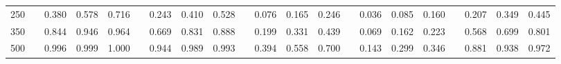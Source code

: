 % 
\begin{tabular}{ccccccccccccccccccccc}
  \hline
  \hline
250 &  & 0.380 & 0.578 & 0.716 &  & 0.243 & 0.410 & 0.528 &  & 0.076 & 0.165 & 0.246 &  & 0.036 & 0.085 & 0.160 &  & 0.207 & 0.349 & 0.445 \\ 
  350 &  & 0.844 & 0.946 & 0.964 &  & 0.669 & 0.831 & 0.888 &  & 0.199 & 0.331 & 0.439 &  & 0.069 & 0.162 & 0.223 &  & 0.568 & 0.699 & 0.801 \\ 
  500 &  & 0.996 & 0.999 & 1.000 &  & 0.944 & 0.989 & 0.993 &  & 0.394 & 0.558 & 0.700 &  & 0.143 & 0.299 & 0.346 &  & 0.881 & 0.938 & 0.972 \\ 
   \hline
\end{tabular}
